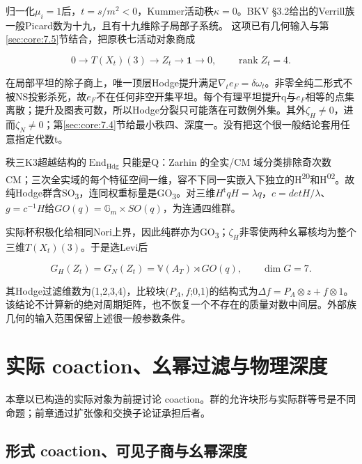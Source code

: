 \documentclass[11pt,a4paper,oneside]{ctexrep}
\theoremstyle{cnplain}
\theoremstyle{definition}
\theoremstyle{remark}
\begin{document}
归一化\(\mu _i=1\)后，\(t=s/m^{2}<0\)，Kummer活动秩\(\kappa =0\)。BKV §3.2给出的Verrill族一般Picard数为十九，且有十九维除子局部子系统。\cite{bkv} 这项已有几何输入与第\ref{sec:core:7.5}节结合，把原秩七活动对象商成

\begin{equation}
0\to T(X_t)(3)\to Z_t\to\mathbf1\to0,
                    \qquad \operatorname{rank}Z_t=4.
\end{equation}

在局部平坦的除子商上，唯一顶层Hodge提升满足\(\nabla _t e_F=\delta \omega _t\)。非零全纯二形式不被NS投影杀死，故\(e_F\)不在任何非空开集平坦。每个有理平坦提升q与\(e_F\)相等的点集离散；提升及图表可数，所以Hodge分裂只可能落在可数例外集。其外\(\zeta _H\ne 0\)，进而\(\zeta _N\ne 0\)；第\ref{sec:core:7.4}节给最小秩四、深度一。没有把这个很一般结论套用任意指定代数t。

秩三K3超越结构的\(\operatorname{End}_{\mathrm{Hdg}}\)只能是Q：Zarhin 的全实/CM 域分类\cite{zarhin}排除奇次数CM；三次全实域的每个特征空间一维，容不下同一实嵌入下独立的H\textsuperscript{20}和H\textsuperscript{02}。故纯Hodge群含SO\textsubscript{3}，连同权重标量是GO\textsubscript{3}。对三维\(H^{\mathsf t}qH=\lambda q\)，\(c=detH/\lambda \)、\(g=c^{-1}H\)给\(GO(q)=\mathbb G_m\times SO(q)\)，为连通四维群。

实际杯积极化给相同Nori上界，因此纯群亦为GO\textsubscript{3}；\(\zeta _H\)非零使两种幺幂核均为整个三维\(T(X_t)(3)\)。于是选Levi后

\begin{equation}
G_H(Z_t)=G_N(Z_t)=\mathbb V(A_T)\rtimes GO(q),
                    \qquad\dim G=7.
\end{equation}

其Hodge过滤维数为(1,2,3,4)，比较块\((P_A,f\);0,1)的结构式为\(\Delta f=P_A\otimes z+f\otimes 1\)。该结论不计算新的绝对周期矩阵，也不恢复一个不存在的质量对数中间层。外部族几何的输入范围保留上述很一般参数条件。


\chapter{实际 coaction、幺幂过滤与物理深度}\label{ch:coaction}
本章以已构造的实际对象为前提讨论 coaction。群的允许块形与实际群等号是不同命题；前章通过扩张像和交换子论证承担后者。
\section{形式 coaction、可见子商与幺幂深度}\label{sec:coaction:9}
\end{document}
